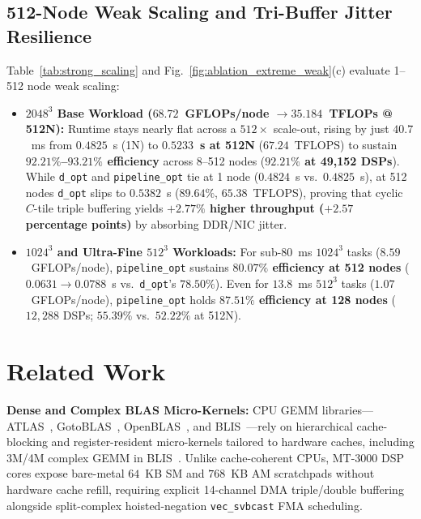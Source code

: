 \documentclass[journal]{IEEEtran}
\begin{document}
\subsection{512-Node Weak Scaling and Tri-Buffer Jitter Resilience}
\label{sec:eval_weak}
Table~\ref{tab:strong_scaling} and Fig.~\ref{fig:ablation_extreme_weak}(c) evaluate 1--512 node weak scaling:
\begin{itemize}\setlength{\itemsep}{0.5pt}\setlength{\parskip}{0pt}
    \item \textbf{$2048^3$ Base Workload ($68.72$~GFLOPs/node $\to 35.184$~TFLOPs @ 512N):} Runtime stays nearly flat across a $512\times$ scale-out, rising by just $40.7$~ms from $0.4825$~s (1N) to \textbf{$0.5233$~s at 512N} ($67.24$~TFLOPS) to sustain \textbf{$92.21\%$--$93.21\%$ efficiency} across 8--512 nodes (\textbf{$92.21\%$ at 49,152 DSPs}). While \texttt{d\_opt} and \texttt{pipeline\_opt} tie at 1 node ($0.4824$~s vs.\ $0.4825$~s), at 512 nodes \texttt{d\_opt} slips to $0.5382$~s ($89.64\%$, $65.38$~TFLOPS), proving that cyclic $C$-tile triple buffering yields \textbf{$+2.77\%$ higher throughput ($+2.57$ percentage points)} by absorbing DDR/NIC jitter.
    \item \textbf{$1024^3$ and Ultra-Fine $512^3$ Workloads:} For sub-$80$~ms $1024^3$ tasks ($8.59$~GFLOPs/node), \texttt{pipeline\_opt} sustains \textbf{$80.07\%$ efficiency at 512 nodes} ($0.0631 \to 0.0788$~s vs.\ \texttt{d\_opt}'s $78.50\%$). Even for $13.8$~ms $512^3$ tasks ($1.07$~GFLOPs/node), \texttt{pipeline\_opt} holds \textbf{$87.51\%$ efficiency at 128 nodes} ($12{,}288$ DSPs; $55.39\%$ vs.\ $52.22\%$ at 512N).
\end{itemize}

\section{Related Work}
\label{sec:related}
\textbf{Dense and Complex BLAS Micro-Kernels:} CPU GEMM libraries---ATLAS~\cite{whaley2001atlas}, GotoBLAS~\cite{goto2008anatomy}, OpenBLAS~\cite{zhang2012openblas}, and BLIS~\cite{vanzee2015blis}---rely on hierarchical cache-blocking and register-resident micro-kernels tailored to hardware caches, including 3M/4M complex GEMM in BLIS~\cite{vanzee2017complex}. Unlike cache-coherent CPUs, MT-3000 DSP cores expose bare-metal $64$~KB SM and $768$~KB AM scratchpads without hardware cache refill, requiring explicit 14-channel DMA triple/double buffering alongside split-complex hoisted-negation \texttt{vec\_svbcast} FMA scheduling.
\end{document}
